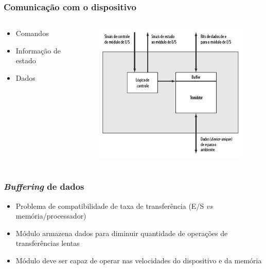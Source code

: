\documentclass[aspectratio=169,
				xcolor=table]{beamer}
\begin{document}
	\begin{frame}
		\frametitle{Comunicação com o dispositivo}
		\begin{columns}
			\begin{column}{0.4\textwidth}
				\begin{itemize}
					\item Comandos
					\vspace{1em}
					\item Informação de estado
					\vspace{1em}
					\item Dados				
				\end{itemize}
			\end{column}
			\begin{column}{0.6\textwidth}
				\begin{figure}[hbtp]
				\centering
				\includegraphics[height=.75\textheight, keepaspectratio]{../figs/cap10/diagrama01.png}
				\end{figure}
			\end{column}
		\end{columns}		
	\end{frame}
	
	\begin{frame}
		\frametitle{\textit{Buffering} de dados}
		\begin{itemize}
			\item Problema de compatibilidade de taxa de transferência (E/S \textit{vs} memória/processador)
			\vspace{1em}
			\item Módulo armazena dados para diminuir quantidade de operações de transferências lentas
			\vspace{1em}
			\item Módulo deve ser capaz de operar nas velocidades do dispositivo e da memória
			
		\end{itemize}
	\end{frame}
	
\end{document}
